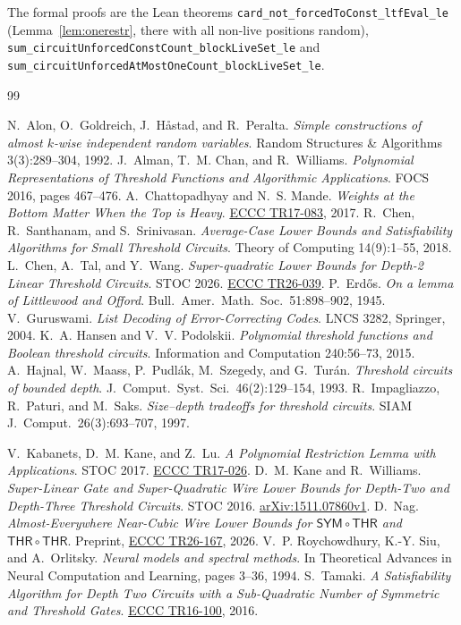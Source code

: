 \documentclass[11pt,letterpaper]{article}
\theoremstyle{remark}
\newcommand{\THR}{\mathsf{THR}}
\begin{document}
The formal proofs are the Lean theorems
\texttt{card\_not\_forcedToConst\_ltfEval\_le} (Lemma~\ref{lem:onerestr}, there
with all non-live positions random),
\texttt{sum\_circuitUnforcedConstCount\_blockLiveSet\_le} and
\texttt{sum\_circuitUnforcedAtMostOneCount\_blockLiveSet\_le}.

\renewcommand{\refname}{\texorpdfstring{\color{ink}References}{References}}
\begin{thebibliography}{99}\setlength{\itemsep}{0pt}\footnotesize

 N.~Alon, O.~Goldreich, J.~H{\aa}stad, and R.~Peralta.
\emph{Simple constructions of almost $k$-wise independent random variables}.
Random Structures \& Algorithms 3(3):289--304, 1992.
 J.~Alman, T.~M. Chan, and R.~Williams.
\emph{Polynomial Representations of Threshold Functions and Algorithmic
Applications}. FOCS 2016, pages 467--476.
 A.~Chattopadhyay and N.~S. Mande.
\emph{Weights at the Bottom Matter When the Top is Heavy}.
\href{https://eccc.weizmann.ac.il/report/2017/083/}{ECCC TR17-083}, 2017.
 R.~Chen, R.~Santhanam, and S.~Srinivasan.
\emph{Average-Case Lower Bounds and Satisfiability Algorithms for Small
Threshold Circuits}. Theory of Computing 14(9):1--55, 2018.
 L.~Chen, A.~Tal, and Y.~Wang.
\emph{Super-quadratic Lower Bounds for Depth-2 Linear Threshold Circuits}.
STOC 2026. \href{https://eccc.weizmann.ac.il/report/2026/039/}{ECCC TR26-039}.
 P.~Erd\H{o}s. \emph{On a lemma of Littlewood and Offord}.
Bull.\ Amer.\ Math.\ Soc.\ 51:898--902, 1945.
 V.~Guruswami. \emph{List Decoding of Error-Correcting Codes}.
LNCS 3282, Springer, 2004.
 K.~A. Hansen and V.~V. Podolskii. \emph{Polynomial threshold
functions and Boolean threshold circuits}. Information and Computation
240:56--73, 2015.
 A.~Hajnal, W.~Maass, P.~Pudl\'ak, M.~Szegedy, and
G.~Tur\'an. \emph{Threshold circuits of bounded depth}. J.\ Comput.\ Syst.\
Sci.\ 46(2):129--154, 1993.
 R.~Impagliazzo, R.~Paturi, and M.~Saks. \emph{Size--depth tradeoffs for threshold circuits}. SIAM J.\ Comput.\ 26(3):693--707, 1997.

 V.~Kabanets, D.~M. Kane, and Z.~Lu.
\emph{A Polynomial Restriction Lemma with Applications}. STOC 2017.
\href{https://eccc.weizmann.ac.il/report/2017/026/}{ECCC TR17-026}.
\bibitem{KW} D.~M. Kane and R.~Williams.
\emph{Super-Linear Gate and Super-Quadratic Wire Lower Bounds for Depth-Two
and Depth-Three Threshold Circuits}. STOC 2016.
\href{https://arxiv.org/abs/1511.07860}{arXiv:1511.07860v1}.
 D.~Nag. \emph{Almost-Everywhere Near-Cubic Wire Lower Bounds for
$\mathsf{SYM}\circ\THR$ and $\THR\circ\THR$}. Preprint,
\href{https://eccc.weizmann.ac.il/report/2026/167/}{ECCC TR26-167}, 2026.
\bibitem{RSO} V.~P. Roychowdhury, K.-Y. Siu, and A.~Orlitsky.
\emph{Neural models and spectral methods}. In Theoretical Advances in Neural
Computation and Learning, pages 3--36, 1994.
 S.~Tamaki. \emph{A Satisfiability Algorithm for Depth Two
Circuits with a Sub-Quadratic Number of Symmetric and Threshold Gates}.
\href{https://eccc.weizmann.ac.il/report/2016/100/}{ECCC TR16-100}, 2016.
\end{thebibliography}
\end{document}
